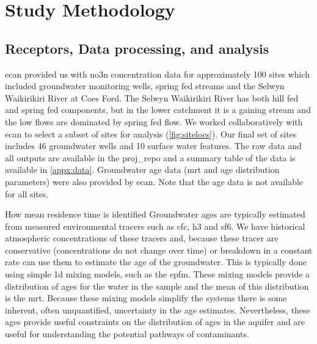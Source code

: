 \section[Methods]{Study Methodology}   \label{sec:methods}
\subsection[Data Processing]{Receptors, Data processing, and analysis} \label{sec:data}

\gls{ecan} provided us with \gls{no3n} concentration data for approximately 100 sites which included groundwater monitoring wells, spring fed streams and the Selwyn Waikirikiri River at Coes Ford.
The Selwyn Waikirikiri River has both hill fed and spring fed components, but in the lower catchment it is a gaining stream and the low flows are dominated by spring fed flow.
We worked collaboratively with \gls{ecan} to select a subset of sites for analysis (\autoref{fig:sitelocs}).
Our final set of sites includes 46 groundwater wells and 10 surface water features.
The raw data and all outputs are available in the \gls{proj_repo} and a summary table of the data is available in \autoref{appx:data}.
Groundwater age data (\gls{mrt} and age distribution parameters) were also provided by \gls{ecan}.
Note that the age data is not available for all sites.

\begin{breakawaybox}[label={box:mrt}]{How mean residence time is identified}
    Groundwater ages are typically estimated from measured environmental tracers such as \gls{cfc}, \gls{h3} and \gls{sf6}.
    We have historical atmospheric concentrations of these tracers and, because these tracer are conservative (concentrations do not change over time) or breakdown in a constant rate can use them to estimate the age of the groundwater. This is typically done using simple 1d mixing models, such as the \gls{epfm}. These mixing models provide a distribution of ages for the water in the sample and the mean of this distribution is the \gls{mrt}. Because these mixing models simplify the systems there is some inherent, often unquantified, uncertainty in the age estimates. Nevertheless, these ages provide useful constraints on the distribution of ages in the aquifer and are useful for understanding the potential pathways of contaminants.

\end{breakawaybox}

